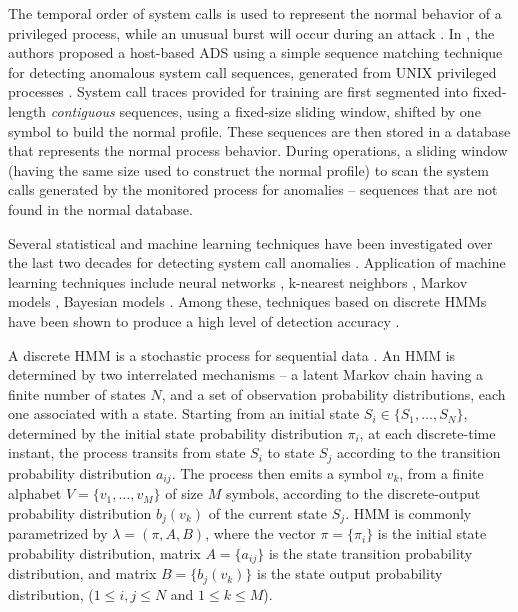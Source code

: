 The temporal order of system calls is used to represent the normal behavior of a privileged process, while an unusual burst will occur during an attack \cite{Forrest1996,Warrender1999}.
In \cite{Forrest1996,Warrender1999}, the authors proposed a host-based ADS using a simple sequence matching technique for detecting anomalous system call sequences, generated from UNIX privileged processes \cite{Forrest1996}.
System call traces provided for training are first segmented into fixed-length \textit{contiguous} sequences, using a fixed-size sliding window, shifted by one symbol to build the normal profile.
These sequences are then stored in a database that represents the normal process behavior.
During operations, a sliding window (having the same size used to construct the normal profile) to scan the system calls generated by the monitored process for anomalies -- sequences that are not found in the normal database.

Several statistical and machine learning techniques have been investigated over the last two decades for detecting system call anomalies \cite{Forrest2008}.
Application of machine learning techniques include neural networks \cite{Ghosh1999}, k-nearest neighbors \cite{Liao2002}, Markov models \cite{Jha2001,Marceau2000}, Bayesian models \cite{Kruegel2003a}.
Among these, techniques based on discrete HMMs have been shown to produce a high level of detection accuracy \cite{Warrender1999,Gao2002,Gao2003,Zhang2003,Du2004,Wang2004,Hoang2004,Khreich2009-ICC,Chen2009,Hu2010,Wang2010}.

A discrete HMM is a stochastic process for sequential data \cite{Khreich2012-INS,Rabiner1989}.
An HMM is determined by two interrelated mechanisms -- a latent Markov chain having a finite number of states $N$, and a set of observation probability distributions, each one associated with a state.
 Starting from an initial state $S_{i}\in\{S_{1},...,S_{N}\}$, determined by the initial state probability distribution $\pi_{i}$, at each discrete-time instant, the process transits from state $S_{i}$ to state $S_{j}$ according to the transition probability distribution $a_{ij}$.
The process then emits a symbol $v_{k}$, from a finite alphabet $V=\{v_{1},\ldots,v_{M}\}$ of size $M$ symbols, according to the discrete-output probability distribution $b_{j}(v_{k})$ of the current state $S_{j}$.
HMM is commonly parametrized by $\lambda=(\pi,A,B)$, where the vector $\pi=\{\pi_{i}\}$ is the initial state probability distribution, matrix $A=\{a_{ij}\}$ is the state transition probability distribution, and matrix $B=\{b_{j}(v_{k})\}$ is the state output probability distribution, ($1\leq i,j\leq N$ and $1\leq k\leq M$).

